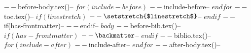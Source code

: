 \documentclass[manuscript,screen,review]{acmart}
\begin{document}
$-- $before-body.tex()$
$-- $for(include-before)$
$-- $include-before$
$-- $endfor$
$-- $toc.tex()$
$-- $if(linestretch)$
$-- \setstretch{$linestretch$}
$-- $endif$
$-- $if(has-frontmatter)$
$-- \mainmatter
$-- $endif$
$-- $body$
$-- $before-bib.tex()$
$-- $if(has-frontmatter)$
$-- \backmatter
$-- $endif$
$-- $biblio.tex()$
$-- $for(include-after)$
$-- $include-after$
$-- $endfor$
$-- $after-body.tex()$
$-- 
\end{document}
